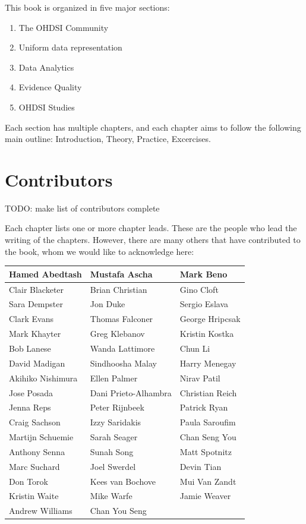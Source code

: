\documentclass[11pt]{book}
\providecommand{\tightlist}{%
  \setlength{\itemsep}{0pt}\setlength{\parskip}{0pt}}
\begin{document}
This book is organized in five major sections:

\begin{enumerate}
\def\labelenumi{\Roman{enumi})}
\tightlist
\item
  The OHDSI Community
\item
  Uniform data representation
\item
  Data Analytics
\item
  Evidence Quality
\item
  OHDSI Studies
\end{enumerate}

Each section has multiple chapters, and each chapter aims to follow the
following main outline: Introduction, Theory, Practice, Excercises.

\section*{Contributors}\label{contributors}

TODO: make list of contributors complete

Each chapter lists one or more chapter leads. These are the people who
lead the writing of the chapters. However, there are many others that
have contributed to the book, whom we would like to acknowledge here:

\begin{tabular}{l|l|l}
\hline
Hamed Abedtash & Mustafa Ascha & Mark Beno\\
\hline
Clair Blacketer & Brian Christian & Gino Cloft\\
\hline
Sara Dempster & Jon Duke & Sergio Eslava\\
\hline
Clark Evans & Thomas Falconer & George Hripcsak\\
\hline
Mark Khayter & Greg Klebanov & Kristin Kostka\\
\hline
Bob Lanese & Wanda Lattimore & Chun Li\\
\hline
David Madigan & Sindhoosha  Malay & Harry Menegay\\
\hline
Akihiko Nishimura & Ellen Palmer & Nirav Patil\\
\hline
Jose Posada & Dani Prieto-Alhambra & Christian Reich\\
\hline
Jenna Reps & Peter Rijnbeek & Patrick Ryan\\
\hline
Craig Sachson & Izzy Saridakis & Paula Saroufim\\
\hline
Martijn Schuemie & Sarah Seager & Chan Seng You\\
\hline
Anthony Senna & Sunah Song & Matt Spotnitz\\
\hline
Marc Suchard & Joel Swerdel & Devin Tian\\
\hline
Don Torok & Kees van Bochove & Mui Van Zandt\\
\hline
Kristin Waite & Mike Warfe & Jamie Weaver\\
\hline
Andrew Williams & Chan You Seng & \\
\hline
\end{tabular}
\end{document}
